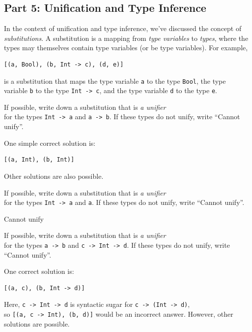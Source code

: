 \documentclass[addpoints]{exam}
\begin{document}
\begin{questions}
\subsection*{\textbf{Part 5: Unification and Type Inference}}

In the context of unification and type inference, we've discussed the concept of \emph{substitutions}.  A substitution is a mapping from \emph{type variables} to \emph{types}, where the types may themselves contain type variables (or be type variables).  For example,
\begin{verbatim}
[(a, Bool), (b, Int -> c), (d, e)]
\end{verbatim}
is a substitution that maps the type variable \verb|a| to the type \verb|Bool|, the type variable \verb|b| to the type \verb|Int -> c|, and the type variable \verb|d| to the type \verb|e|.

\question[2] If possible, write down a substitution that is \emph{a unifier} \\ for the types \texttt{Int -> a} and \texttt{a -> b}.  If these types do not unify, write ``Cannot unify''.

\begin{solutionorbox}[1in]
One simple correct solution is:
\begin{verbatim}
[(a, Int), (b, Int)]
\end{verbatim}
Other solutions are also possible.
\end{solutionorbox}

\question[2] If possible, write down a substitution that is \emph{a unifier} \\ for the types \texttt{Int -> a} and \texttt{a}.  If these types do not unify, write ``Cannot unify''.

\begin{solutionorbox}[1in]
Cannot unify
\end{solutionorbox}

\question[2] If possible, write down a substitution that is \emph{a unifier} \\ for the types \texttt{a -> b} and \texttt{c -> Int -> d}.   If these types do not unify, write ``Cannot unify''.

\begin{solutionorbox}[1in]
One correct solution is:
\begin{verbatim}
[(a, c), (b, Int -> d)]
\end{verbatim}
Here, \verb|c -> Int -> d| is syntactic sugar for \verb|c -> (Int -> d)|, \\
so \verb|[(a, c -> Int), (b, d)]| would be an incorrect answer. However, other solutions are possible.
\end{solutionorbox}


\end{questions}
\end{document}
